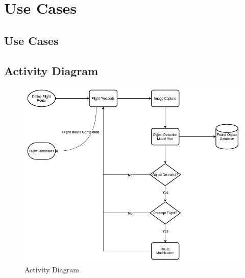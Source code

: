 \chapter{Use Cases}
\section{Use Cases}
\section{Activity Diagram}
\begin{figure}[h]
\centering
\includegraphics[width=1\linewidth]{assets/activity-diagram.png}
\caption{Activity Diagram}
\label{activity_diagram}
\end{figure}

